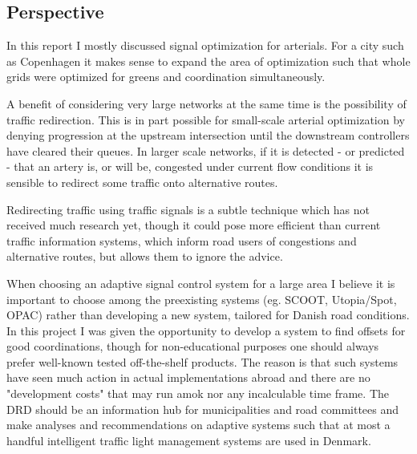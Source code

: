 \subsection{Perspective}
In this report I mostly discussed signal optimization for arterials. For a city such as Copenhagen it makes sense to expand the area of optimization such that whole grids were optimized for greens and coordination simultaneously.

A benefit of considering very large networks at the same time is the possibility of traffic redirection. This is in part possible for small-scale arterial optimization by denying progression at the upstream intersection until the downstream controllers have cleared their queues. In larger scale networks, if it is detected - or predicted - that an artery is, or will be, congested under current flow conditions it is sensible to redirect some traffic onto alternative routes. 

Redirecting traffic using traffic signals is a subtle technique which has not received much research yet, though it could pose more efficient than current traffic information systems, which inform road users of congestions and alternative routes, but allows them to ignore the advice.

When choosing an adaptive signal control system for a large area I believe it is important to choose among the preexisting systems (eg. SCOOT, Utopia/Spot, OPAC) rather than developing a new system, tailored for Danish road conditions. 
In this project I was given the opportunity to develop a system to find offsets for good coordinations, though for non-educational purposes one should always prefer well-known tested off-the-shelf products. The reason is that such systems have seen much action in actual implementations abroad and there are no "development costs" that may run amok nor any incalculable time frame.
The DRD should be an information hub for municipalities and road committees and make analyses and recommendations on adaptive systems such that at most a handful intelligent traffic light management systems are used in Denmark.
